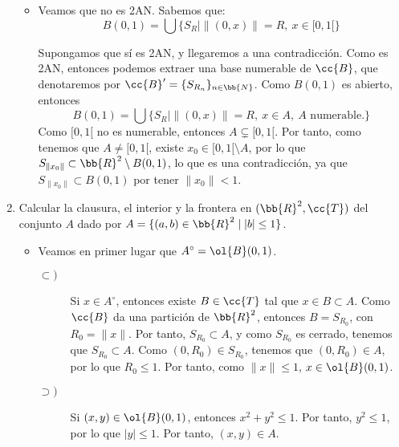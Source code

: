 \documentclass[12pt]{article}
\newcommand{\T}[0]{\cc{T}}
\begin{document}
\begin{ejercicio}[4.5 puntos]
\begin{enumerate}
\begin{itemize}
                \item Veamos que no es 2AN. Sabemos que:
                \begin{equation*}
                    B(0,1) = \bigcup \{S_R\mid \|(0, x)\|=R,~x\in [0,1[\}
                \end{equation*}
                
                Supongamos que sí es 2AN, y llegaremos a una contradicción.
                Como es 2AN, entonces podemos extraer una base numerable de $\cc{B}$,
                que denotaremos por $\cc{B}'=\{S_{R_n}\}_{n\in \bb{N}}$. Como $B(0,1)$ es abierto, entonces
                \begin{equation*}
                    B(0,1) = \bigcup \{S_R\mid \|(0, x)\|=R,~x\in A,~A \text{ numerable.}\}
                \end{equation*}
                Como $[0,1[$ no es numerable, entonces $A\subsetneq [0,1[$. Por tanto, como tenemos que $A\neq [0,1[$,
                existe $x_0\in [0,1[\setminus A$, por lo que $S_{\|x_0\|}\subset \bb{R}^2\setminus B(0,1)$, lo que
                es una contradicción, ya que $S_{\|x_0\|}\subset B(0,1)$ por tener $\|x_0\|<1$.
            \end{itemize}

            \item Calcular la clausura, el interior y la frontera en $(\bb{R}^2,\T)$ del conjunto $A$
            dado por $A=\{(a,b)\in \bb{R}^2\mid |b|\leq 1\}$.
            \begin{itemize}
                \item Veamos en primer lugar que $A^{\circ} = \ol{B}(0,1)$.
                \begin{description}
                    \item[$\subset)$] Si $x\in A^{\circ}$, entonces existe $B\in \T$ tal que $x\in B\subset A$.
                    Como $\cc{B}$ da una partición de $\bb{R}^2$, entonces $B=S_{R_0}$, con $R_0=\|x\|$. Por tanto,
                    $S_{R_0}\subset A$, y como $S_{R_0}$ es cerrado, tenemos que $S_{R_0}\subset A$. Como $(0, R_0)\in S_{R_0}$,
                    tenemos que $(0, R_0) \in A$, por lo que $R_0\leq 1$. Por tanto, como $\|x\|\leq 1$, $x\in \ol{B}(0,1)$.

                    \item[$\supset)$] Si $(x,y)\in \ol{B}(0,1)$, entonces $x^2 + y^2 \leq 1$. Por tanto, $y^2\leq 1$, por lo que $|y|\leq 1$.
                    Por tanto, $(x,y)\in A$.
                \end{description}
            \end{itemize}


\end{enumerate}
\end{ejercicio}
\end{document}
